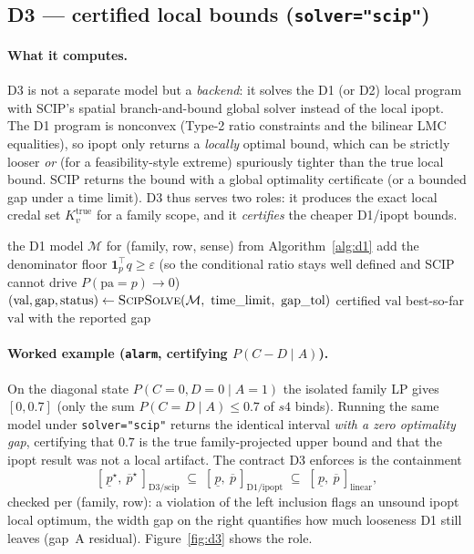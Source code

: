\documentclass[11pt]{article}
\begin{document}
\subsection{D3 --- certified local bounds (\texttt{solver="scip"})}
\label{sec:d3-detail}

\paragraph{What it computes.} D3 is not a separate model but a \emph{backend}: it solves the
D1 (or D2) local program with SCIP's spatial branch-and-bound global solver instead of the
local ipopt. The D1 program is nonconvex (Type-2 ratio constraints and the bilinear LMC
equalities), so ipopt only returns a \emph{locally} optimal bound, which can be strictly
looser \emph{or} (for a feasibility-style extreme) spuriously tighter than the true local
bound. SCIP returns the bound with a global optimality certificate (or a bounded gap under a
time limit). D3 thus serves two roles: it produces the exact local credal set $K_v^{\mathrm
{true}}$ for a family scope, and it \emph{certifies} the cheaper D1/ipopt bounds.

\begin{algorithm}[t]
\caption{D3 certified local bound (\texttt{solver="scip"} on the D1 model)}
\label{alg:d3}
\begin{algorithmic}[1]
\Require the D1 model $\mathcal M$ for (family, row, sense) from Algorithm~\ref{alg:d1}
\State add the denominator floor $\mathbf 1_p^\top q \ge \varepsilon$ (so the conditional ratio
  stays well defined and SCIP cannot drive $P(\mathrm{pa}{=}p)\!\to\!0$)
\State $(\text{val},\text{gap},\text{status}) \gets \textsc{ScipSolve}(\mathcal M,\
  \text{time\_limit},\ \text{gap\_tol})$
  \Return certified $\text{val}$
\Else{} \Return best-so-far $\text{val}$ with the reported gap 
\EndIf
\end{algorithmic}
\end{algorithm}

\paragraph{Worked example (\texttt{alarm}, certifying $P(C\!-\!D\mid A)$).} On the diagonal
state $P(C{=}0,D{=}0\mid A{=}1)$ the isolated family LP gives $[0,0.7]$ (only the sum
$P(C{=}D\mid A)\le 0.7$ of $s4$ binds). Running the same model under \texttt{solver="scip"}
returns the identical interval \emph{with a zero optimality gap}, certifying that $0.7$ is the
true family-projected upper bound and that the ipopt result was not a local artifact. The
contract D3 enforces is the containment
\[
  [\,\underline p^\star,\ \overline p^\star\,]_{\text{D3/scip}} \;\subseteq\;
  [\,\underline p,\ \overline p\,]_{\text{D1/ipopt}} \;\subseteq\;
  [\,\underline p,\ \overline p\,]_{\text{linear}},
\]
checked per (family, row): a violation of the left inclusion flags an unsound ipopt local
optimum, the width gap on the right quantifies how much looseness D1 still leaves (gap~A
residual). Figure~\ref{fig:d3} shows the role.
\end{document}
